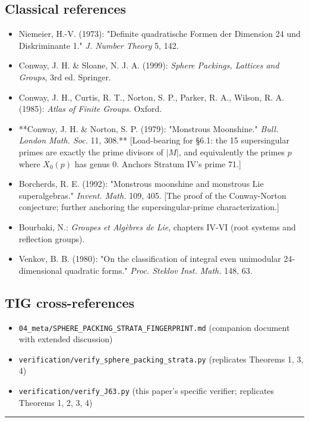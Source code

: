 \documentclass[11pt,reqno]{amsart}
\theoremstyle{plain}
\theoremstyle{definition}
\begin{document}
\subsection{Classical references}
\begin{itemize}
\item Niemeier, H.-V. (1973): "Definite quadratische Formen der Dimension 24 und Diskriminante 1." \textit{J. Number Theory} 5, 142.
\item Conway, J. H. \& Sloane, N. J. A. (1999): \textit{Sphere Packings, Lattices and Groups}, 3rd ed. Springer.
\item Conway, J. H., Curtis, R. T., Norton, S. P., Parker, R. A., Wilson, R. A. (1985): \textit{Atlas of Finite Groups}. Oxford.
\item **Conway, J. H. & Norton, S. P. (1979): "Monstrous Moonshine." \textit{Bull. London Math. Soc.} 11, 308.** [Load-bearing for §6.1: the 15 supersingular primes are exactly the prime divisors of $|M|$, and equivalently the primes $p$ where $X_0(p)$ has genus 0. Anchors Stratum IV's prime 71.]
\item Borcherds, R. E. (1992): "Monstrous moonshine and monstrous Lie superalgebras." \textit{Invent. Math.} 109, 405. [The proof of the Conway-Norton conjecture; further anchoring the supersingular-prime characterization.]
\item Bourbaki, N.: \textit{Groupes et Algèbres de Lie}, chapters IV-VI (root systems and reflection groups).
\item Venkov, B. B. (1980): "On the classification of integral even unimodular 24-dimensional quadratic forms." \textit{Proc. Steklov Inst. Math.} 148, 63.
\end{itemize}

\subsection{TIG cross-references}
\begin{itemize}
\item \texttt{04_meta/SPHERE_PACKING_STRATA_FINGERPRINT.md} (companion document with extended discussion)
\item \texttt{verification/verify_sphere_packing_strata.py} (replicates Theorems 1, 3, 4)
\item \texttt{verification/verify_J63.py} (this paper's specific verifier; replicates Theorems 1, 2, 3, 4)
\end{itemize}

\medskip\hrule\medskip
\end{document}
